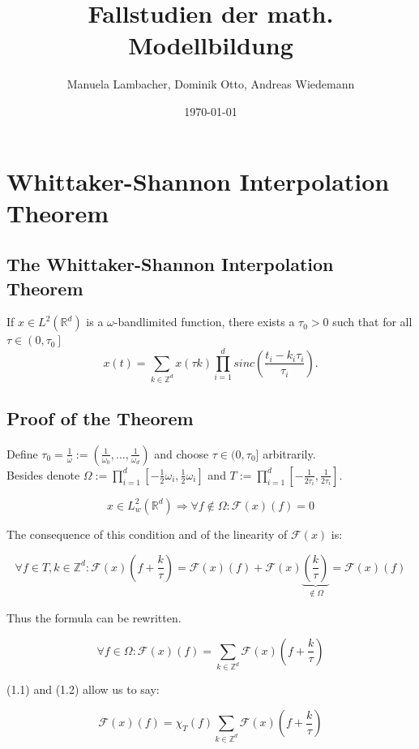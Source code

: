 \documentclass[a4paper, 11pt]{scrreprt}
\title{Fallstudien der math. Modellbildung}
\author{Manuela Lambacher, Dominik Otto, Andreas Wiedemann}
\date{\today}
\newcommand{\RR}{\mathbb{R}}
\newcommand{\ZZ}{\mathbb{Z}}
\newcommand{\FF}{\mathcal{F}}
\begin{document}
\parindent 0pt
\maketitle
\tableofcontents

\chapter{Whittaker-Shannon Interpolation Theorem}

\section{The Whittaker-Shannon Interpolation Theorem}
If \(x \in L^2(\RR^d)\) is a \(\omega\)-bandlimited function, there exists a \(\tau_0 > 0\) such that for all \(\tau \in \left(0,\tau_0\right]\)
\[x(t) = \sum_{k \in \ZZ^d} x(\tau k) \prod_{i=1}^d sinc\left(\frac{t_i-k_i \tau_i}{\tau_i}\right).\]

\section{Proof of the Theorem}
Define \(\tau_0 = \frac{1}{\omega} := \left(\frac{1}{\omega_0}, \ldots, \frac{1}{\omega_d}\right)\) and choose \(\tau \in (0,\tau_0]\) arbitrarily. \\
Besides denote \(\Omega := \prod_{i=1}^d \left[-\frac{1}{2}\omega_i ,\frac{1}{2}\omega_i\right]\) and \(T := \prod_{i=1}^d \left[-\frac{1}{2\tau_i} ,\frac{1}{2\tau_i}\right]\).

\begin{equation}
x \in L^2_w(\RR^d) \Rightarrow \forall f\notin \Omega: \FF(x)(f) = 0
\end{equation}

The consequence of this condition and of the linearity of \(\FF(x)\) is:

\[\forall f\in T, k \in \ZZ^d: \FF(x)\left(f+\frac{k}{\tau}\right) = \FF(x)(f) + \FF(x)\underbrace{\left(\frac{k}{\tau}\right)}_{\notin \Omega} = \FF(x)(f)\]

Thus the formula can be rewritten.

\begin{equation}
\forall f \in \Omega: \FF(x)(f) = \sum_{k \in \ZZ^d} \FF(x)\left( f+\frac{k}{\tau}\right)
\end{equation} 

(1.1) and (1.2) allow us to say:

\[\FF(x)(f) = \chi_{T}(f) \sum_{k \in \ZZ^d} \FF(x)\left(f+\frac{k}{\tau}\right)\]
\end{document}
